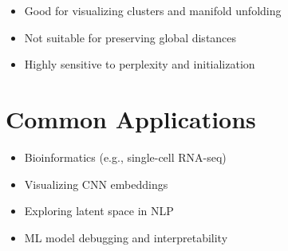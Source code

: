 \documentclass[11pt]{article}
\begin{document}
\begin{itemize}
  \item Good for visualizing clusters and manifold unfolding
  \item Not suitable for preserving global distances
  \item Highly sensitive to perplexity and initialization
\end{itemize}

\section{Common Applications}

\begin{itemize}
  \item Bioinformatics (e.g., single-cell RNA-seq)
  \item Visualizing CNN embeddings
  \item Exploring latent space in NLP
  \item ML model debugging and interpretability
\end{itemize}
\end{document}
